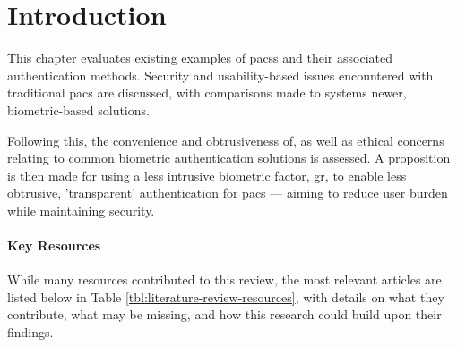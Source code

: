 \section{Introduction}
\label{sec:context-introduction}

This chapter evaluates existing examples of \acp{pacs} and their associated authentication methods.
Security and usability-based issues encountered with traditional \ac{pacs} are discussed, with comparisons made to systems newer, biometric-based solutions.

Following this, the convenience and obtrusiveness of, as well as ethical concerns relating to common biometric authentication solutions is assessed.
A proposition is then made for using a less intrusive biometric factor, \ac{gr}, to enable less obtrusive, 'transparent' authentication for \ac{pacs} --- aiming to reduce user burden while maintaining security.

\paragraph{Key Resources}
While many resources contributed to this review, the most relevant articles are listed below in Table \ref{tbl:literature-review-resources}, with details on what they contribute, what may be missing, and how this research could build upon their findings.

